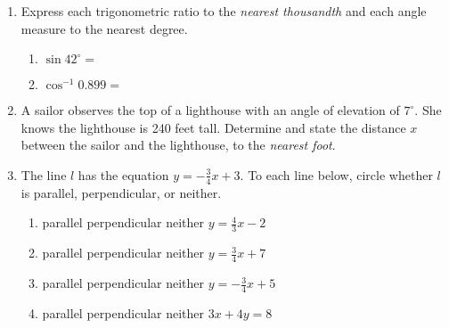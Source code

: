 \documentclass[12pt, twoside]{article}
\begin{document}
\begin{enumerate}
  \item Express each trigonometric ratio to the \emph{nearest thousandth} and each angle measure to the nearest degree.
    \begin{multicols}{2}
      \begin{enumerate}
        \item $\sin 42^\circ =$ \vspace{0.5cm}
        \item $\cos^{-1} 0.899 =$ \vspace{0.5cm}
      \end{enumerate}
    \end{multicols} \vspace{0.25cm}

  \item A sailor observes the top of a lighthouse with an angle of elevation of $7^\circ$. She knows the lighthouse is 240 feet tall. Determine and state the distance $x$ between the sailor and the lighthouse, to the \emph{nearest foot}.\\[0.5cm]
     \vspace{3.25cm}

\newpage
  \item The line $l$ has the equation $y=-\frac{3}{4}x+3$. To each line below, circle whether $l$ is parallel, perpendicular, or neither.
    \begin{enumerate}
      \item parallel \quad perpendicular \quad neither \qquad $y=\frac{4}{3}x-2$
      \vspace{0.5cm}
      \item parallel \quad perpendicular \quad neither \qquad $y=\frac{3}{4}x+7$
      \vspace{0.5cm}
      \item parallel \quad perpendicular \quad neither \qquad $y=-\frac{3}{4}x +5$
      \vspace{0.5cm}
      \item parallel \quad perpendicular \quad neither \qquad $3x+4y=8$
      \vspace{3.5cm}
    \end{enumerate}


\end{enumerate}
\end{document}
